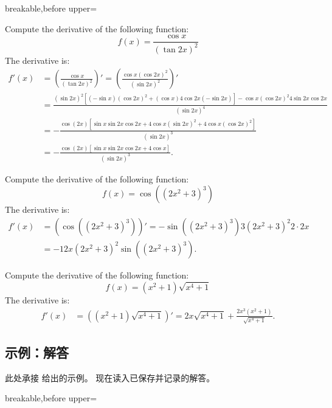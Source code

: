 \begin{dispListing*}{breakable,before upper=}
\begin{exercise}
  Compute the derivative of the following function:
  \begin{equation*}
    f(x)=\frac{\cos x}{(\tan 2x)^2}
  \end{equation*}
\tcblower
  The derivative is:
  \begin{align*}
    f'(x) &= \left( \frac{\cos x}{(\tan 2x)^2} \right)'
    = \left( \frac{\cos x (\cos 2x)^2}{(\sin 2x)^2} \right)'\\
    &= \frac{(\sin 2x)^2 [(-\sin x)(\cos 2x)^2+(\cos x)4\cos 2x (-\sin 2x)]
       - \cos x (\cos 2x)^2 4\sin 2x \cos 2x}{(\sin 2x)^4}\\
    &= -\frac{\cos(2x) [\sin x \sin 2x \cos 2x+ 4\cos x(\sin 2x)^2
       + 4 \cos x (\cos 2x)^2]}{(\sin 2x)^3}\\
    &= -\frac{\cos(2x) [\sin x \sin 2x \cos 2x+ 4\cos x]}{(\sin 2x)^3}.
  \end{align*}
\end{exercise}

\begin{exercise}
  Compute the derivative of the following function:
  \begin{equation*}
    f(x)=\cos((2x^2+3)^3)
  \end{equation*}
\tcblower
  The derivative is:
  \begin{align*}
    f'(x) &= \left( \cos((2x^2+3)^3) \right)'
    =-\sin((2x^2+3)^3) 3(2x^2+3)^2 2\cdot 2x\\
    &=-12x(2x^2+3)^2\sin((2x^2+3)^3).
  \end{align*}
\end{exercise}

\begin{exercise}
  Compute the derivative of the following function:
  \begin{equation*}
    f(x)=(x^2+1)\sqrt{x^4+1}
  \end{equation*}
\tcblower
  The derivative is:
  \begin{align*}
    f'(x) &= \left( (x^2+1)\sqrt{x^4+1} \right)'
    = 2x\sqrt{x^4+1} + \frac{2x^3(x^2+1)}{\sqrt{x^4+1}}.
  \end{align*}
\end{exercise}

\tcbstoprecording
\end{dispListing*}
\tcbusetemp

\subsection{示例：解答}\label{sec:recording-solutions}
此处承接  给出的示例。
现在读入已保存并记录的解答。

\begin{dispListing*}{breakable,before upper=}
\tcbinputrecords
\end{dispListing*}
\tcbusetemp
